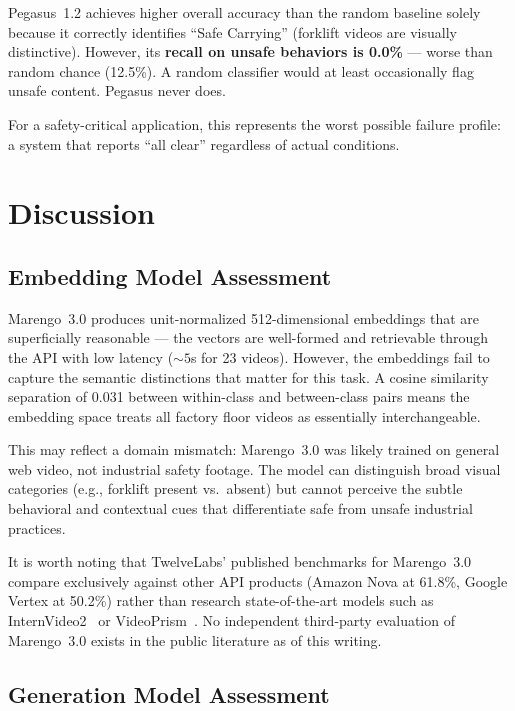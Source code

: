 \documentclass[11pt,a4paper]{article}
\begin{document}
Pegasus~1.2 achieves higher overall accuracy than the random baseline solely because it correctly identifies ``Safe Carrying'' (forklift videos are visually distinctive). However, its \textbf{recall on unsafe behaviors is 0.0\%} --- worse than random chance (12.5\%). A random classifier would at least occasionally flag unsafe content. Pegasus never does.

For a safety-critical application, this represents the worst possible failure profile: a system that reports ``all clear'' regardless of actual conditions.

\section{Discussion}

\subsection{Embedding Model Assessment}

Marengo~3.0 produces unit-normalized 512-dimensional embeddings that are superficially reasonable --- the vectors are well-formed and retrievable through the API with low latency (${\sim}5$s for 23 videos). However, the embeddings fail to capture the semantic distinctions that matter for this task. A cosine similarity separation of 0.031 between within-class and between-class pairs means the embedding space treats all factory floor videos as essentially interchangeable.

This may reflect a domain mismatch: Marengo~3.0 was likely trained on general web video, not industrial safety footage. The model can distinguish broad visual categories (e.g., forklift present vs.\ absent) but cannot perceive the subtle behavioral and contextual cues that differentiate safe from unsafe industrial practices.

It is worth noting that TwelveLabs' published benchmarks for Marengo~3.0~\cite{marengo_blog} compare exclusively against other API products (Amazon Nova at 61.8\%, Google Vertex at 50.2\%) rather than research state-of-the-art models such as InternVideo2~\cite{internvideo2} or VideoPrism~\cite{videoprism}. No independent third-party evaluation of Marengo~3.0 exists in the public literature as of this writing.

\subsection{Generation Model Assessment}
\end{document}
